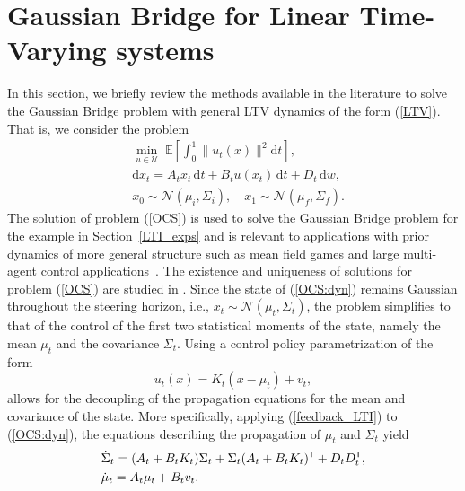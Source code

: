 \documentclass[twoside]{article}
\renewcommand{\eqref}[1]{(\ref{#1})}
\renewcommand{\t}{^{\mbox{\tiny\sf T}}} %
\newcommand{\N}{\mathcal{N}}
\renewcommand{\E}{\mathbb{E}}
\renewcommand{\d}{\mathrm{d}}
\begin{document}
\section{Gaussian Bridge for Linear Time-Varying systems} \label{App:OCS}
%
\setcounter{equation}{0}
\renewcommand{\theequation}{C.\arabic{equation}}
%
In this section, we briefly review the methods available in the literature to solve the Gaussian Bridge problem with general LTV dynamics of the form \eqref{LTV}.
That is, we consider the problem 
\begin{subequations} \label{OCS}
\begin{align}
& \min_{u \in \mathcal{U}} \; \E \left[ \int_{0}^{1}{ \| u_t(x) \|^2 \d t} \right], \label{OCS:cost} \\
&     \d x_t = A_t x_t \, \d t + B_t u(x_t) \, \d t + D_t \, \d w, \label{OCS:dyn} \\
& x_0 \sim \N(\mu_i, \Sigma_i), \quad x_1 \sim \N(\mu_f, \Sigma_f). \label{OCS:BC}
\end{align}
\end{subequations}
The solution of problem \eqref{OCS} is used to solve the Gaussian Bridge problem for the example in Section~\ref{LTI_exps} and is relevant to applications with prior dynamics of more general structure such as mean field games \citep{bensoussan2016linear} and large multi-agent control applications~\citep{saravanos2023distributed}.
%
The existence and uniqueness of solutions for problem \eqref{OCS} are studied in \citep{chen2015optimal, liu2022optimal, liu2024reachability}.
Since the state of \eqref{OCS:dyn} remains Gaussian throughout the steering horizon, i.e., $x_t \sim \N(\mu_t, \Sigma_t)$, the problem simplifies to that of the control of the first two statistical moments of the state, namely the mean $\mu_t$ and the covariance $\Sigma_t$. 
Using a control policy parametrization of the form 
\begin{equation} \label{feedback_LTI}
    u_t(x) = K_t(x-\mu_t) + v_t,
\end{equation}
allows for the decoupling of the propagation equations for the mean and covariance of the state. 
More specifically, applying \eqref{feedback_LTI} to \eqref{OCS:dyn}, the equations describing the propagation of $\mu_t$ and $\Sigma_t$ yield
\begin{subequations}
\begin{align}
& \dot{\Sigma}_t = (A_t + B_t K_t) \Sigma_t+ \Sigma_t (A_t + B_t K_t) \t + D_t D_t\t, \label{Cov_prop}\\
& \dot{\mu}_t = A_t \mu_t + B_t v_t. \label{mean_prop}
\end{align}
\end{subequations}
\end{document}
